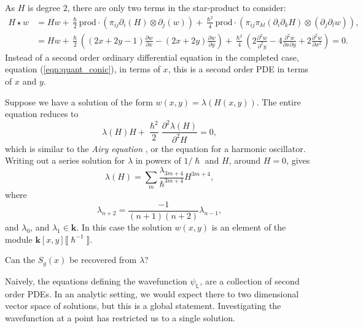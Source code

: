     As \(H\) is degree \(2\), there are only two terms in the star-product to consider:
    \begin{align*}
        H \star w &= H w + \frac{\hslash}{2} \mathrm{prod} \cdot (\pi_{ij} \partial_i ( H ) \otimes \partial_j (w) ) + \frac{\hslash^2}{4} \mathrm{prod} \cdot ( \pi_{ij} \pi_{kl} (\partial_i \partial_k H) \otimes (\partial_{j} \partial_{l} w )), \\
        &= H w +\frac{\hslash }{2}  \left((2 x+2 y-1)  \frac{\partial w}{\partial x}-(2 x+2 y) \frac{\partial w}{\partial y} \right) +  \frac{\hslash^2 }{4} \left(2 \frac{\partial^2 w}{\partial^2 y}-4 \frac{\partial^2 w}{\partial x \partial y}+2 \frac{\partial^2 w}{\partial x^2}\right)=0.
    \end{align*}
    Instead of a second order ordinary differential equation in the completed case, equation (\ref{eqn:quant_conic}), in terms of \(x\), this is a second order PDE in terms of \(x\) and \(y\). 

    Suppose we have a solution of the form \(w(x,y)= \lambda(H(x,y))\). The entire equation reduces to
    \[ \lambda(H) H + \frac{\hslash^2}{2} \frac{\partial^2 \lambda(H)}{\partial^2 H } = 0,\]
    which is similar to the \emph{Airy equation} \cite{airy}, or the equation for a harmonic oscillator.  Writing out a series solution for \( \lambda\) in powers of \( 1/\hslash\) and \(H\), around \(H=0\), gives
    \[ \lambda(H) = \sum_m \frac{\lambda_{3m+4} }{\hslash^{3m+4}} H^{3m+4},\]
    where
    \[ \lambda_{n+2} = \frac{-1}{(n+1)(n+2)} \lambda_{n-1},\]
    and \( \lambda_0\), and \( \lambda_1 \in \mathbf{k}\). In this case the solution \(w(x,y)\) is an element of the module \( \mathbf{k}[x,y]\lBrack\hslash^{-1} \rBrack\). 
    \begin{ques} 
    Can the \(S_g(x)\) be recovered from \( \lambda\)?
    \end{ques}

    
    \begin{rem}
    Naively, the equations defining the wavefunction \( \psi_{\mathbb{L}}\), are a collection of second order PDEs. In an analytic setting, we would expect there to two dimensional vector space of solutions, but this is a global statement. Investigating the wavefunction at a point has restricted us to a single solution.
    \end{rem}
    
